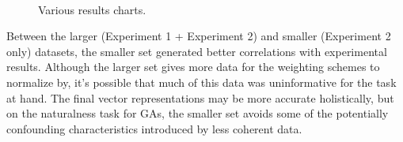\documentclass[11pt]{article}
\begin{document}
\begin{figure}[ht]
\begin{center}
~

  \caption{Various results charts.}
  \label{fig:all}
\end{center}
\end{figure}

Between the larger (Experiment 1 + Experiment 2) and smaller (Experiment 2 only) datasets, the smaller set generated better correlations with experimental results. Although the larger set gives more data for the weighting schemes to normalize by, it's possible that much of this data was uninformative for the task at hand. The final vector representations may be more accurate holistically, but on the naturalness task for GAs, the smaller set avoids some of the potentially confounding characteristics introduced by less coherent data.
\end{document}
